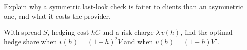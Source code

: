 \begin{interviewq}\label{iq:hf:fx-market-making:5}
Explain why a symmetric last-look check is fairer to clients than an asymmetric one, and what it costs the provider.
\end{interviewq}

\begin{interviewq}\label{iq:hf:fx-market-making:6}
With spread $S$, hedging cost $hC$ and a risk charge $\lambda\,v(h)$, find the optimal hedge share when $v(h)=(1-h)^2V$ and when
$v(h)=(1-h)V'$.
\end{interviewq}
